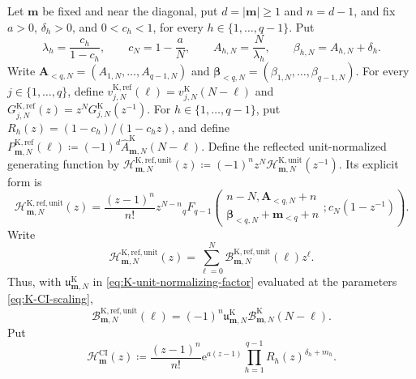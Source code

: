 \documentclass[10pt]{amsart}
\newcommand{\e}{\mathrm e}
\newcommand{\A}{\boldsymbol A}
\newcommand{\bbeta}{\boldsymbol\beta}
\newcommand{\mm}{\boldsymbol m}
\newcommand{\abs}[1]{\lvert#1\rvert}
\newcommand{\pFq}[5]{{}_{#1}F_{#2}\!\left(\begin{matrix}#3\\#4\end{matrix};#5\right)}
\theoremstyle{plain}
\theoremstyle{definition}
\theoremstyle{remark}
\begin{document}
Let \(\mm\) be fixed and near the diagonal, put
\(d=\abs\mm\ge1\) and \(n=d-1\), and fix \(a>0\),
\(\delta_h>0\), and \(0<c_h<1\), for every
\(h\in\{1,\ldots,q-1\}\). Put
\begin{equation}
 \lambda_h=\frac{c_h}{1-c_h},\qquad
 c_N=1-\frac aN,\qquad
 A_{h,N}=\frac N{\lambda_h},\qquad
 \beta_{h,N}=A_{h,N}+\delta_h.
 \label{eq:K-CI-scaling}
\end{equation}
Write
\(\A_{<q,N}=(A_{1,N},\ldots,A_{q-1,N})\) and
\(\bbeta_{<q,N}=(\beta_{1,N},\ldots,\beta_{q-1,N})\).
For every \(j\in\{1,\ldots,q\}\), define
\(v_{j,N}^{\mathrm K,\mathrm{ref}}(\ell)
=v_{j,N}^{\mathrm K}(N-\ell)\) and
\(G_{j,N}^{\mathrm K,\mathrm{ref}}(z)=z^NG_{j,N}^{\mathrm K}(z^{-1})\).
For \(h\in\{1,\ldots,q-1\}\), put
\(R_h(z)=(1-c_h)/(1-c_hz)\), and define
\(P_{\mm,N}^{\mathrm K,\mathrm{ref}}(\ell)
\coloneq(-1)^d\widehat A_{\mm,N}^{\mathrm K}(N-\ell)\).
Define the reflected unit-normalized generating function by
\(\mathcal H_{\mm,N}^{\mathrm K,\mathrm{ref},\mathrm{unit}}(z)
\coloneq(-1)^nz^N
\mathcal H_{\mm,N}^{\mathrm K,\mathrm{unit}}(z^{-1})\). Its explicit form is
\begin{equation}
 \mathcal H_{\mm,N}^{\mathrm K,\mathrm{ref},\mathrm{unit}}(z)
 =
 \frac{(z-1)^n}{n!}z^{N-n}
 \pFq{q}{q-1}
 {n-N,\A_{<q,N}+n}
 {\bbeta_{<q,N}+\mm_{<q}+n}
 {c_N(1-z^{-1})}.
 \label{eq:K-reflected-unit-B}
\end{equation}
Write
\begin{equation}
 \mathcal H_{\mm,N}^{\mathrm K,\mathrm{ref},\mathrm{unit}}(z)
 =\sum_{\ell=0}^N
 \mathcal B_{\mm,N}^{\mathrm K,\mathrm{ref},\mathrm{unit}}(\ell)z^\ell.
 \label{eq:K-reflected-unit-coefficients}
\end{equation}
Thus, with \(\mathfrak u_{\mm,N}^{\mathrm K}\) in
\eqref{eq:K-unit-normalizing-factor} evaluated at the parameters
\eqref{eq:K-CI-scaling},
\begin{equation}
 \mathcal B_{\mm,N}^{\mathrm K,\mathrm{ref},\mathrm{unit}}(\ell)
 =(-1)^n\mathfrak u_{\mm,N}^{\mathrm K}
 \mathcal B_{\mm,N}^{\mathrm K}(N-\ell).
 \label{eq:K-reflected-unit-coefficient-identity}
\end{equation}
Put
\begin{equation}
 \mathcal H_{\mm}^{\mathrm{CI}}(z)
 \coloneq
 \frac{(z-1)^n}{n!}\e^{a(z-1)}
 \prod_{h=1}^{q-1}R_h(z)^{\delta_h+m_h}.
\end{equation}
\end{document}

